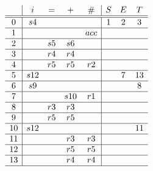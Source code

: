 \documentclass{jarticle}
\begin{document}
\[
  \begin{array}{c|cccc|ccc}
   &  i &  = &  + & \# & S & E & T\\\hline\hline
0  & s4 &    &    &    & 1 & 2 & 3\\\hline
1  &    &    &    &acc &   &   &  \\\hline
2  &    & s5 & s6 &    &   &   &  \\\hline
3  &    & r4 & r4 &    &   &   &  \\\hline
4  &    & r5 & r5 & r2 &   &   &  \\\hline
5  & s12&    &    &    &   & 7 & 13\\\hline
6  & s9 &    &    &    &   &   & 8\\\hline
7  &    &    & s10& r1 &   &   &  \\\hline
8  &    & r3 & r3 &    &   &   &  \\\hline
9  &    & r5 & r5 &    &   &   &  \\\hline
10 & s12&    &    &    &   &   & 11\\\hline
11 &    &    & r3 & r3 &   &   &  \\\hline
12 &    &    & r5 & r5 &   &   &  \\\hline
13 &    &    & r4 & r4 &   &   &  \\\hline
  \end{array}
\]
\end{document}
